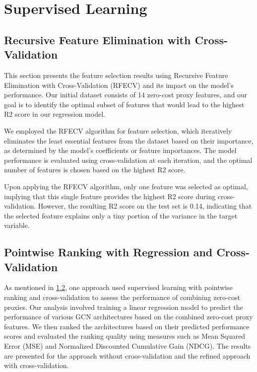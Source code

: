 
\section{Supervised Learning}
\subsection{Recursive Feature Elimination with Cross-Validation}
This section presents the feature selection results using Recursive Feature Elimination with Cross-Validation (RFECV) and its impact on the model's performance. Our initial dataset consists of 14 zero-cost proxy features, and our goal is to identify the optimal subset of features that would lead to the highest R2 score in our regression model.

We employed the RFECV algorithm for feature selection, which iteratively eliminates the least essential features from the dataset based on their importance, as determined by the model's coefficients or feature importances. The model performance is evaluated using cross-validation at each iteration, and the optimal number of features is chosen based on the highest R2 score.

Upon applying the RFECV algorithm, only one feature was selected as optimal, implying that this single feature provides the highest R2 score during cross-validation. However, the resulting R2 score on the test set is 0.14, indicating that the selected feature explains only a tiny portion of the variance in the target variable.

\subsection{Pointwise Ranking with Regression and Cross-Validation}


As mentioned in \cref{}, one approach used supervised learning with pointwise ranking and cross-validation to assess the performance of combining zero-cost proxies. Our analysis involved training a linear regression model to predict the performance of various \gls{GCN} architectures based on the combined zero-cost proxy features. We then ranked the architectures based on their predicted performance scores and evaluated the ranking quality using measures such as Mean Squared Error (MSE) and Normalized Discounted Cumulative Gain (NDCG). The results are presented for the approach without cross-validation and the refined approach with cross-validation.

